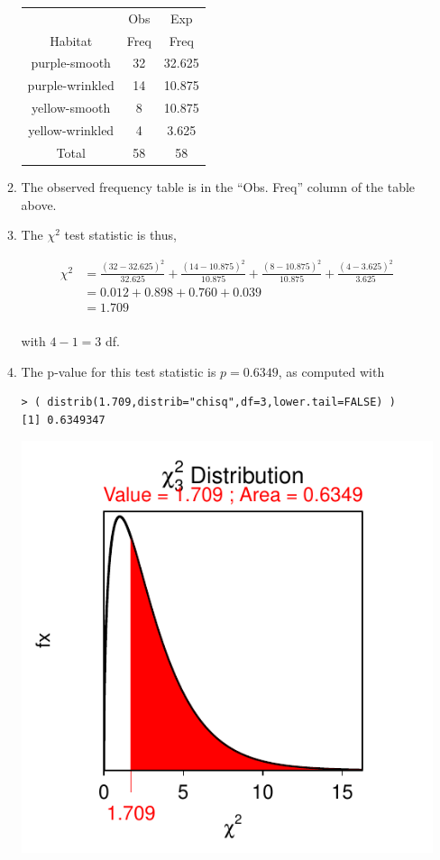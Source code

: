 \documentclass[10pt,openany]{book}\usepackage[]{graphicx}\usepackage[]{color}
\makeatletter
\newenvironment{kframe}{%
 \def\at@end@of@kframe{}%
 \ifinner\ifhmode%
  \def\at@end@of@kframe{\end{minipage}}%
  \begin{minipage}{\columnwidth}%
 \fi\fi%
 \def\FrameCommand##1{\hskip\@totalleftmargin \hskip-\fboxsep
 \colorbox{shadecolor}{##1}\hskip-\fboxsep
     \hskip-\linewidth \hskip-\@totalleftmargin \hskip\columnwidth}%
 \MakeFramed {\advance\hsize-\width
   \@totalleftmargin\z@ \linewidth\hsize
   \@setminipage}}%
 {\par\unskip\endMakeFramed%
 \at@end@of@kframe}
\newenvironment{knitrout}{}{} %
\makeatother
\begin{document}
\begin{itemize}
\begin{enumerate}
        \begin{center}
          \begin{tabular}{ccc}
            \hline\hline
            & Obs & Exp \\
            Habitat & Freq & Freq \\
            \hline
            purple-smooth   & 32 & 32.625 \\
            purple-wrinkled & 14 & 10.875 \\
            yellow-smooth   &  8 & 10.875 \\
            yellow-wrinkled &  4 &  3.625 \\
            \hline
            Total & 58 & 58 \\
            \hline\hline
          \end{tabular}
        \end{center}
      \item The observed frequency table is in the ``Obs. Freq'' column of the table above.
      \item The $\chi^{2}$ test statistic is thus,
        \begin{center}
          \[  \begin{split}
            \chi^{2} &= \frac{(32-32.625)^{2}}{32.625} + \frac{(14-10.875)^{2}}{10.875} + \frac{(8-10.875)^{2}}{10.875} + \frac{(4-3.625)^{2}}{3.625} \\
            &= 0.012 + 0.898 + 0.760 + 0.039 \\
            & = 1.709 \\
          \end{split}  \]
        \end{center}
        with $4-1=3$ df.
      \item The p-value for this test statistic is $p=0.6349$, as computed with
\begin{knitrout}
\color{fgcolor}\begin{kframe}
\begin{verbatim}
> ( distrib(1.709,distrib="chisq",df=3,lower.tail=FALSE) )
[1] 0.6349347
\end{verbatim}
\end{kframe}

{\centering \includegraphics[width=.4\linewidth]{Figs/unnamed-chunk-402-1} 

}
\end{knitrout}
\end{enumerate}
\end{itemize}
\end{document}
